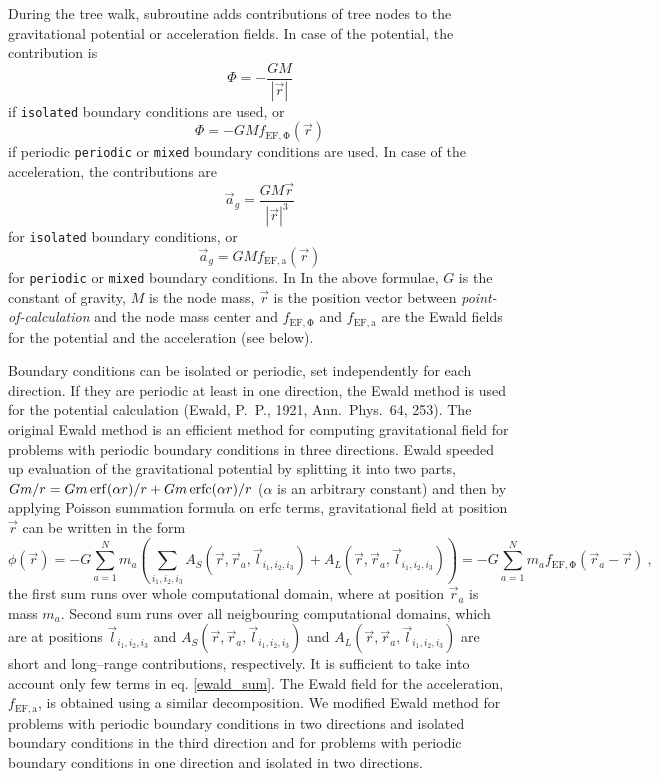 During the tree walk, subroutine  adds contributions
of tree nodes to the gravitational potential or acceleration fields. In case of
the potential, the contribution is 
\begin{equation}
\Phi = -\frac{GM}{|\vec{r}|}
\end{equation}
if \texttt{isolated} boundary conditions are used, or
\begin{equation}
\Phi = -GMf_\mathrm{EF,\Phi}(\vec{r})
\end{equation}
if periodic \texttt{periodic} or \texttt{mixed} boundary conditions are used. In
case of the acceleration, the contributions are 
\begin{equation}
\vec{a}_g = \frac{GM\vec{r}}{|\vec{r}|^3}
\end{equation}
for \texttt{isolated} boundary conditions, or
\begin{equation}
\vec{a}_g = GMf_\mathrm{EF,a}(\vec{r})
\end{equation}
for \texttt{periodic} or \texttt{mixed} boundary conditions. In In the above
formulae, $G$ is the constant of gravity, $M$ is the node mass, $\vec{r}$ is the
position vector between {\em point-of-calculation} and the node mass center and
$f_\mathrm{EF,\Phi}$ and $f_\mathrm{EF,a}$ are the Ewald fields for the
potential and the acceleration (see below).

Boundary conditions can be isolated or periodic, set independently for each
direction. If they are periodic at least in one direction, the Ewald method is
used for the potential calculation (Ewald, P.~P., 1921, Ann.\ Phys.\ 64, 253).
The original Ewald method is an efficient method for computing gravitational
field for problems with periodic boundary conditions in three directions. Ewald
speeded up evaluation of the gravitational potential by splitting it into two parts,
$Gm/r=Gm \, \mathrm{erf}(\alpha r)/r + Gm \, \mathrm{erfc}(\alpha r)/r$ ($\alpha$ is an
arbitrary constant) and then by applying Poisson summation formula on erfc
terms, gravitational field at position $\vec{r}$  can be written in the form
%
\begin{equation}
\phi (\vec{r})  =  -G \sum_{a=1}^N m_a \left( \sum_{i_1,i_2,i_3} A_S(\vec{r},\vec{r}_a,\vec{l}_{i_1,i_2,i_3}) + 
A_L(\vec{r},\vec{r}_a,\vec{l}_{i_1,i_2,i_3})  \right)
= -G \sum_{a=1}^N m_a f_\mathrm{EF,\Phi}(\vec{r}_a - \vec{r}) \ ,
\label{ewald_sum}
\end{equation}
%
the first sum runs over whole computational domain, where at position
$\vec{r}_a$ is mass $m_a$. Second sum runs over all neigbouring computational
domains, which are at positions $\vec{l}_{i_1,i_2,i_3}$ and
$A_S(\vec{r},\vec{r}_a,\vec{l}_{i_1,i_2,i_3})$ and
$A_L(\vec{r},\vec{r}_a,\vec{l}_{i_1,i_2,i_3})$ are short and long--range
contributions, respectively. It is sufficient to take into account only few
terms in eq. \ref{ewald_sum}. The Ewald field for the acceleration,
$f_\mathrm{EF,a}$, is obtained using a similar decomposition. We modified Ewald
method for problems with periodic boundary conditions in two directions and
isolated boundary conditions in the third direction and for problems with
periodic boundary conditions in one direction and isolated in two directions.

